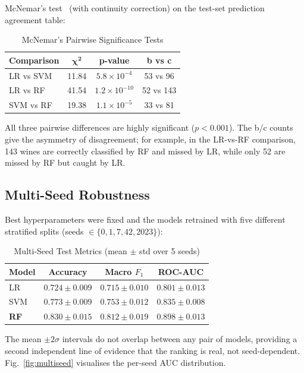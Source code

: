 \documentclass[conference]{IEEEtran}
\begin{document}
McNemar's test~\cite{mcnemar1947} (with continuity correction) on the
test-set prediction agreement table:

\begin{table}[h]
\centering
\caption{McNemar's Pairwise Significance Tests}
\label{tab:mcnemar}
\begin{tabular}{l c c c}
\toprule
\textbf{Comparison} & $\boldsymbol{\chi^2}$ & \textbf{p-value}
& \textbf{b vs c} \\
\midrule
LR vs SVM & 11.84 & $5.8 \times 10^{-4}$ & 53 vs 96 \\
LR vs RF & 41.54 & $1.2 \times 10^{-10}$ & 52 vs 143 \\
SVM vs RF & 19.38 & $1.1 \times 10^{-5}$ & 33 vs 81 \\
\bottomrule
\end{tabular}
\end{table}

All three pairwise differences are highly significant ($p < 0.001$).
The b/c counts give the asymmetry of disagreement; for example, in the
LR-vs-RF comparison, 143 wines are correctly classified by RF and missed
by LR, while only 52 are missed by RF but caught by LR.

\subsection{Multi-Seed Robustness}

Best hyperparameters were fixed and the models retrained with five
different stratified splits (seeds $\in \{0, 1, 7, 42, 2023\}$):

\begin{table}[h]
\centering
\caption{Multi-Seed Test Metrics (mean $\pm$ std over 5 seeds)}
\label{tab:multiseed}
\begin{tabular}{l c c c}
\toprule
\textbf{Model} & \textbf{Accuracy} & \textbf{Macro $F_1$} &
\textbf{ROC-AUC} \\
\midrule
LR & $0.724 \pm 0.009$ & $0.715 \pm 0.010$ & $0.801 \pm 0.013$ \\
SVM & $0.773 \pm 0.009$ & $0.753 \pm 0.012$ & $0.835 \pm 0.008$ \\
\textbf{RF} & $\mathbf{0.830 \pm 0.015}$ & $\mathbf{0.812 \pm 0.019}$ &
$\mathbf{0.898 \pm 0.013}$ \\
\bottomrule
\end{tabular}
\end{table}

The mean $\pm 2\sigma$ intervals do not overlap between any pair of
models, providing a second independent line of evidence that the
ranking is real, not seed-dependent. Fig.~\ref{fig:multiseed}
visualises the per-seed AUC distribution.
\end{document}
